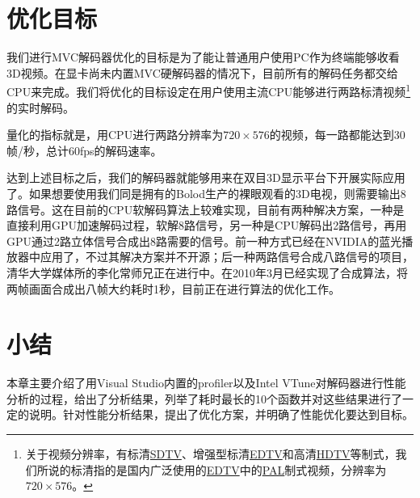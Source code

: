 \section{优化目标}
\label{sec:optaim}

我们进行MVC解码器优化的目标是为了能让普通用户使用PC作为终端能够收看3D视频。在显卡尚未内置MVC硬解码器的情况下，目前所有的解码任务都交给CPU来完成。我们将优化的目标设定在用户使用主流CPU能够进行两路标清视频\footnote{关于视频分辨率，有标清\href{http://en.wikipedia.org/wiki/Standard-definition_television}{SDTV}、增强型标清\href{http://en.wikipedia.org/wiki/Enhanced-definition_television}{EDTV}和高清\href{http://en.wikipedia.org/wiki/High-definition_television}{HDTV}等制式，我们所说的标清指的是国内广泛使用的\href{http://en.wikipedia.org/wiki/Enhanced-definition_television}{EDTV}中的\href{http://en.wikipedia.org/wiki/Phase_Alternating_Line}{PAL}制式视频，分辨率为$720\times576$。}的实时解码。

量化的指标就是，用CPU进行两路分辨率为$720\times576$的视频，每一路都能达到30帧/秒，总计60fps的解码速率。

达到上述目标之后，我们的解码器就能够用来在双目3D显示平台下开展实际应用了。如果想要使用我们同是拥有的Bolod生产的裸眼观看的3D电视，则需要输出8路信号。这在目前的CPU软解码算法上较难实现，目前有两种解决方案，一种是直接利用GPU加速解码过程，软解8路信号，另一种是CPU解码出2路信号，再用GPU通过2路立体信号合成出8路需要的信号。前一种方式已经在NVIDIA的蓝光播放器中应用了，不过其解决方案并不开源；后一种两路信号合成八路信号的项目，清华大学媒体所的李化常师兄正在进行中。在2010年3月已经实现了合成算法，将两帧画面合成出八帧大约耗时1秒，目前正在进行算法的优化工作。

\section{小结}
\label{sec:sum3}
本章主要介绍了用Visual Studio内置的profiler以及Intel VTune对解码器进行性能分析的过程，给出了分析结果，列举了耗时最长的10个函数并对这些结果进行了一定的说明。针对性能分析结果，提出了优化方案，并明确了性能优化要达到目标。